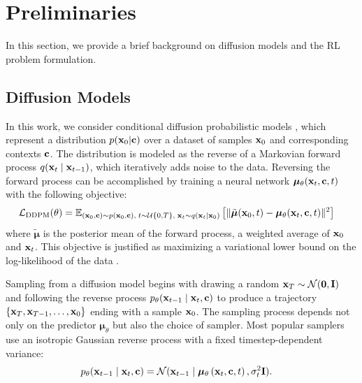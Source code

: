 \section{Preliminaries}

In this section, we provide a brief background on diffusion models and the RL problem formulation.

\subsection{Diffusion Models}
\label{sec:diffusion_background}

In this work, we consider conditional diffusion probabilistic models \citep{sohldickstein2015nonequilibrium,ho2020denoising}, which represent a distribution $p(\mathbf{x}_0 | \mathbf{c})$ over a dataset of samples $\mathbf{x}_0$ and corresponding contexts $\mathbf{c}$.
The distribution is modeled as the reverse of a Markovian forward process $q(\mathbf{x}_t \mid \mathbf{x}_{t-1})$, which iteratively adds noise to the data.
Reversing the forward process can be accomplished by training a neural network $\bm{\mu}_\theta(\mathbf{x}_t, \mathbf{c}, t)$ with the following objective:
\begin{align}
    \mathcal{L}_{\text{DDPM}}(\theta) &= \mathbb{E}_{(\mathbf{x}_0, \mathbf{c}) \sim p(\mathbf{x}_0, \mathbf{c}), \; t \sim \mathcal{U}\{0, T\}, \; \mathbf{x}_t \sim q(\mathbf{x}_t \mid \mathbf{x}_0)} \left[ 
        \lVert
            \tilde{\bm{\mu}}(\mathbf{x}_0, t) - \bm{\mu}_\theta(\mathbf{x}_t, \mathbf{c}, t)
        \rVert^2
     \right]
    \label{eq:denoising_objective}
\end{align}
where $\tilde{\bm{\mu}}$ is the posterior mean of the forward process, a weighted average of $\mathbf{x}_0$ and $\mathbf{x}_t$.
This objective is justified as maximizing a variational lower bound on the log-likelihood of the data \citep{ho2020denoising}.

Sampling from a diffusion model begins with drawing a random $\mathbf{x}_T \sim \mathcal{N}(\mathbf{0}, \mathbf{I})$ and following the reverse process $p_\theta(\mathbf{x}_{t-1} \mid \mathbf{x}_t, \mathbf{c})$ to produce a trajectory $\{\mathbf{x}_T, \mathbf{x}_{T-1}, \dots, \mathbf{x}_0\}$ ending with a sample $\mathbf{x}_0$.
The sampling process depends not only on the predictor $\bm{\mu}_\theta$ but also the choice of sampler.
Most popular samplers~\citep{ho2020denoising,song2021denoising} use an isotropic Gaussian reverse process with a fixed timestep-dependent variance:
\begin{align}
    p_\theta(\mathbf{x}_{t-1} \mid \mathbf{x}_t, \mathbf{c}) & = \mathcal{N}(\mathbf{x}_{t-1} \mid \bm{\mu}_\theta\left(\mathbf{x}_t, \mathbf{c}, t\right), \sigma_t^2 \mathbf{I}).
    \label{eq:sampler}
\end{align}

